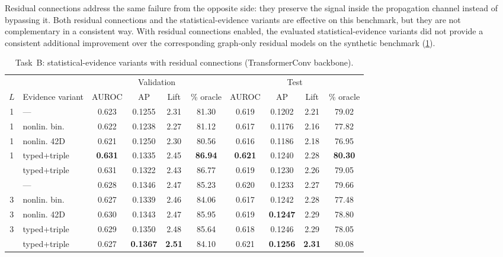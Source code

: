     Residual connections address the same failure from the opposite side: they
    preserve the signal inside the propagation channel instead of bypassing it.
    Both residual connections and the statistical-evidence variants are effective on this benchmark, but they are not complementary in a consistent way.
    With residual connections enabled, the evaluated statistical-evidence variants did not provide a consistent additional improvement over the corresponding graph-only residual models on the synthetic benchmark
    (\cref{tab:hcr-res}).

    \begin{table}[H]
      \centering
      \small
      \setlength{\tabcolsep}{4pt}
      \caption{Task~B: statistical-evidence variants with residual connections
        (TransformerConv backbone).}
      \label{tab:hcr-res}
      \begin{tabular}{clcccccccc}
        \toprule
        & & \multicolumn{4}{c}{Validation} & \multicolumn{4}{c}{Test} \\
        \cmidrule(lr){3-6}\cmidrule(lr){7-10}
        $L$ & Evidence variant & AUROC & AP & Lift & \% oracle & AUROC & AP & Lift & \% oracle \\
        \midrule
        1 & ---            & 0.623 & 0.1255 & 2.31 & 81.30 & 0.619 & 0.1202 & 2.21 & 79.02 \\
        1 & nonlin. bin.   & 0.622 & 0.1238 & 2.27 & 81.12 & 0.617 & 0.1176 & 2.16 & 77.82 \\
        1 & nonlin. 42D    & 0.621 & 0.1250 & 2.30 & 80.56 & 0.616 & 0.1186 & 2.18 & 76.95 \\
        1 & typed+triple   & \textbf{0.631} & 0.1335 & 2.45 & \textbf{86.94} & \textbf{0.621} & 0.1240 & 2.28 & \textbf{80.30} \\
        \addlinespace[4pt]
        2 & typed+triple   & 0.631 & 0.1322 & 2.43 & 86.77 & 0.619 & 0.1230 & 2.26 & 79.05 \\
        \addlinespace[4pt]
        3 & ---            & 0.628 & 0.1346 & 2.47 & 85.23 & 0.620 & 0.1233 & 2.27 & 79.66 \\
        3 & nonlin. bin.   & 0.627 & 0.1339 & 2.46 & 84.06 & 0.617 & 0.1242 & 2.28 & 77.48 \\
        3 & nonlin. 42D    & 0.630 & 0.1343 & 2.47 & 85.95 & 0.619 & \textbf{0.1247} & 2.29 & 78.80 \\
        3 & typed+triple   & 0.629 & 0.1350 & 2.48 & 85.64 & 0.618 & 0.1246 & 2.29 & 78.05 \\
        \addlinespace[4pt]
        4 & typed+triple   & 0.627 & \textbf{0.1367} & \textbf{2.51} & 84.10 & 0.621 & \textbf{0.1256} & \textbf{2.31} & 80.08 \\

\end{tabular}
\end{table}
